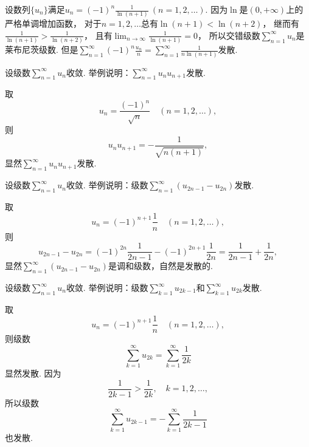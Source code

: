 \begin{example}
设数列\(\{u_n\}\)满足\(u_n = (-1)^n \frac1{\ln(n+1)}\ (n=1,2,\dotsc)\).
因为\(\ln\)是\((0,+\infty)\)上的严格单调增加函数，
对于\(n=1,2,\dotsc\)总有\(\ln(n+1) < \ln(n+2)\)，
继而有\(\frac1{\ln(n+1)} > \frac1{\ln(n+2)}\)，
且有\(\lim_{n\to\infty} \frac1{\ln(n+1)} = 0\)，
所以交错级数\(\sum_{n=1}^\infty u_n\)是莱布尼茨级数.
但是\(\sum_{n=1}^\infty (-1)^n \frac{u_n}{n}
= \sum_{n=1}^\infty \frac1{n \ln(n+1)}\)发散.
\end{example}

\begin{example}
设级数\(\sum_{n=1}^\infty u_n\)收敛.
举例说明：\(\sum_{n=1}^\infty u_n u_{n+1}\)发散.
\begin{solution}
取\begin{equation*}
	u_n = \frac{(-1)^n}{\sqrt{n}}
	\quad(n=1,2,\dotsc),
\end{equation*}
则\begin{equation*}
	u_n u_{n+1}
	= -\frac1{\sqrt{n(n+1)}},
\end{equation*}
显然\(\sum_{n=1}^\infty u_n u_{n+1}\)发散.
\end{solution}
\end{example}

\begin{example}
设级数\(\sum_{n=1}^\infty u_n\)收敛.
举例说明：级数\(\sum_{n=1}^\infty (u_{2n-1} - u_{2n})\)发散.
\begin{solution}
取\begin{equation*}
	u_n = (-1)^{n+1} \frac1n
	\quad(n=1,2,\dotsc),
\end{equation*}
则\begin{equation*}
	u_{2n-1} - u_{2n}
	= (-1)^{2n} \frac1{2n-1} - (-1)^{2n+1} \frac1{2n}
	= \frac1{2n-1} + \frac1{2n},
\end{equation*}
显然\(\sum_{n=1}^\infty (u_{2n-1} - u_{2n})\)是调和级数，自然是发散的.
\end{solution}
\end{example}

\begin{example}
设级数\(\sum_{n=1}^\infty u_n\)收敛.
举例说明：级数\(\sum_{k=1}^\infty u_{2k-1}\)和\(\sum_{k=1}^\infty u_{2k}\)发散.
\begin{solution}
取\begin{equation*}
	u_n = (-1)^{n+1} \frac1n
	\quad(n=1,2,\dotsc),
\end{equation*}
则级数\begin{equation*}
	\sum_{k=1}^\infty u_{2k}
	= \sum_{k=1}^\infty \frac1{2k}
\end{equation*}显然发散.
因为\begin{equation*}
	\frac1{2k-1} > \frac1{2k},
	\quad k=1,2,\dotsc,
\end{equation*}
所以级数\begin{equation*}
	\sum_{k=1}^\infty u_{2k-1}
	= -\sum_{k=1}^\infty \frac1{2k-1}
\end{equation*}也发散.
\end{solution}
\end{example}

